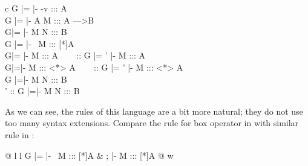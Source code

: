 \begin{center}
\footnotesize
\begin{spacing}{3}
\begin{tabular}{ c }
			{G |= \Gamma |- \hyp{v} ::: A}\\
			    {G |= \Gamma |-  A M ::: A --->B}\\
			     {G|= \Gamma |- \appl M N ::: B}\\

			     {G |= \Gamma |- \bboxe{}\ M ::: [*]A}  \\

				 {G|= \Gamma |- \unbox M ::: A} ~~~
			      {\Gamma :: G |= \Gamma' |- \unbox M ::: A}\\

			     {G|=\Gamma |- \here M ::: <*> A} ~~~
			     {\Gamma :: G |= \Gamma' |- \here M ::: <*> A}\\

	{G |=\Gamma |-  {} M N ::: B}\\

	{\Gamma' :: G |=\Gamma |-  {} M N ::: B}
\end{tabular}
\end{spacing}
\normalsize
\end{center}

As we can see, the rules of this language are a bit more natural; they do not use too many syntax extensions. Compare the rule for box operator in \langLF{} with similar rule in \langL{}:

\begin{center}
\footnotesize
\begin{tabular}{@{} l l }
			     {G |= \Gamma |- \bboxe{}\ M ::: [*]A} &
			     {\Omega; \Gamma |-  M ::: [*]A @ w}
\end{tabular}
\normalsize
\end{center}

